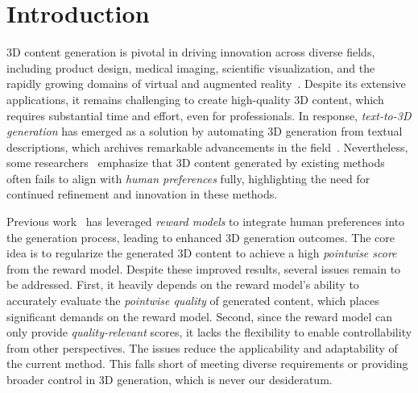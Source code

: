 \section{Introduction}
\label{sec:intro}
3D content generation is pivotal in driving innovation across diverse fields, including product design, medical imaging, scientific visualization, and the rapidly growing domains of virtual and augmented reality~\citep{li2023generative}. Despite its extensive applications, it remains challenging to create high-quality 3D content, which requires substantial time and effort, even for professionals. In response, \textit{text-to-3D generation} has emerged as a solution by automating 3D generation from textual descriptions, which archives remarkable advancements in the field~\citep{poole2022dreamfusion,wang2023prolificdreamer,wang2022sjc,yu2023text,wang2024prolificdreamer,shi2023mvdream,katzir2023noise,chung2023luciddreamer,wu2024consistent3d}. Nevertheless, some researchers~\citep{xie2024carve3d,ye2025dreamreward} emphasize that 3D content generated by existing methods often fails to align with \textit{human preferences} fully, highlighting the need for continued refinement and innovation in these methods.

Previous work~\citep{ye2025dreamreward} has leveraged \textit{reward models} to integrate human preferences into the generation process, leading to enhanced 3D generation outcomes. The core idea is to regularize the generated 3D content to achieve a high \textit{pointwise score} from the reward model. Despite these improved results, several issues remain to be addressed. First, it heavily depends on the reward model's ability to accurately evaluate the \textit{pointwise quality} of generated content, which places significant demands on the reward model. Second, since the reward model can only provide \textit{quality-relevant} scores, it lacks the flexibility to enable controllability from other perspectives. The issues reduce the applicability and adaptability of the current method. This falls short of meeting diverse requirements or providing broader control in 3D generation, which is never our desideratum.

